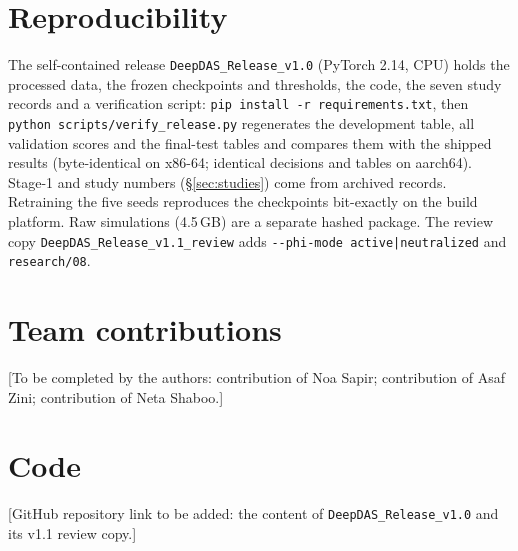 \documentclass[10pt,a4paper,twocolumn]{article}
\begin{document}
\section{Reproducibility}
The self-contained release \texttt{DeepDAS\_Release\_v1.0} (PyTorch 2.14, CPU) holds the processed data, the frozen checkpoints and thresholds, the code, the seven study records and a verification script: \texttt{pip install -r requirements.txt}, then \texttt{python scripts/verify\_release.py} regenerates the development table, all validation scores and the final-test tables and compares them with the shipped results (byte-identical on x86-64; identical decisions and tables on aarch64). Stage-1 and study numbers (\S\ref{sec:studies}) come from archived records. Retraining the five seeds reproduces the checkpoints bit-exactly on the build platform. Raw simulations (4.5\,GB) are a separate hashed package. The review copy \texttt{DeepDAS\_Release\_v1.1\_review} adds \texttt{-{}-phi-mode active|neutralized} and \texttt{research/08}.

\balance
\section*{Team contributions}
\textcolor{note}{[To be completed by the authors: contribution of Noa Sapir; contribution of Asaf Zini; contribution of Neta Shaboo.]}

\section*{Code}
\textcolor{note}{[GitHub repository link to be added: the content of \texttt{DeepDAS\_Release\_v1.0} and its v1.1 review copy.]}
\end{document}
